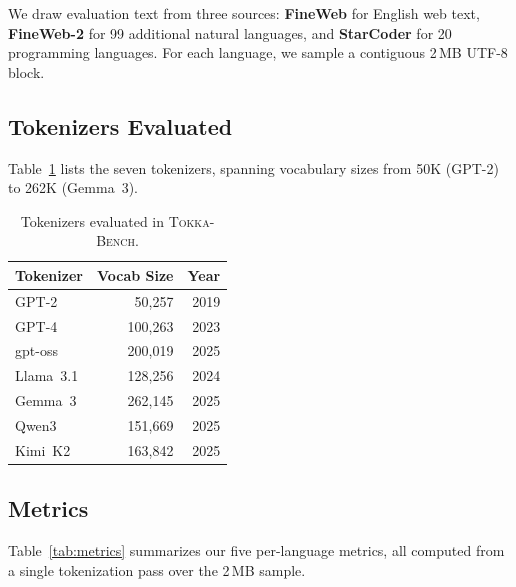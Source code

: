 \documentclass[11pt]{article}
\begin{document}
We draw evaluation text from three sources:
\textbf{FineWeb} \citep{penedo2024fineweb} for English web text,
\textbf{FineWeb-2} for 99 additional natural languages, and
\textbf{StarCoder} \citep{li2023starcoder} for 20 programming languages.
For each language, we sample a contiguous 2\,MB UTF-8 block.

\subsection{Tokenizers Evaluated}

Table~\ref{tab:tokenizers} lists the seven tokenizers, spanning vocabulary sizes from 50K (GPT-2) to 262K (Gemma~3).

\begin{table}[t]
\centering
\small
\begin{tabular}{@{}lrr@{}}
\toprule
\textbf{Tokenizer} & \textbf{Vocab Size} & \textbf{Year} \\
\midrule
GPT-2         &  50{,}257  & 2019 \\
GPT-4         & 100{,}263  & 2023 \\
gpt-oss       & 200{,}019  & 2025 \\
Llama~3.1     & 128{,}256  & 2024 \\
Gemma~3       & 262{,}145  & 2025 \\
Qwen3         & 151{,}669  & 2025 \\
Kimi~K2       & 163{,}842  & 2025 \\
\bottomrule
\end{tabular}
\caption{Tokenizers evaluated in \textsc{Tokka-Bench}.}
\label{tab:tokenizers}
\end{table}

\subsection{Metrics}
\label{sec:metrics}

Table~\ref{tab:metrics} summarizes our five per-language metrics, all computed from a single tokenization pass over the 2\,MB sample.
\end{document}
